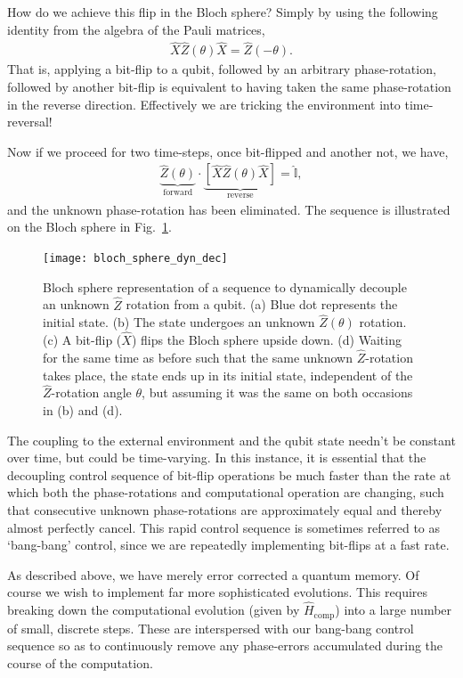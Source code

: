 How do we achieve this flip in the Bloch sphere? Simply by using the following identity from the algebra of the Pauli matrices,
\begin{align}
\hat{X}\hat{Z}(\theta)\hat{X} = 	\hat{Z}(-\theta).
\end{align}
That is, applying a bit-flip to a qubit, followed by an arbitrary phase-rotation, followed by another bit-flip is equivalent to having taken the same phase-rotation in the reverse direction. Effectively we are tricking the environment into time-reversal!

Now if we proceed for two time-steps, once bit-flipped and another not, we have,
\begin{align}
\underbrace{\hat{Z}(\theta)}_{\mathrm{forward}}\cdot\underbrace{[\hat{X}\hat{Z}(\theta)\hat{X}]}_{\mathrm{reverse}} = \hat{\mathbb{I}},
\end{align}
and the unknown phase-rotation has been eliminated. The sequence is illustrated on the Bloch sphere in Fig.~\ref{fig:bloch_sphere_dyn_dec}.

\begin{figure}[htpb]
\texttt{[image: bloch\_sphere\_dyn\_dec]}
\caption{Bloch sphere representation of a sequence to dynamically decouple an unknown $\hat{Z}$ rotation from a qubit. (a) Blue dot represents the initial state. (b) The state undergoes an unknown $\hat{Z}(\theta)$ rotation. (c) A bit-flip ($\hat{X}$) flips the Bloch sphere upside down. (d) Waiting for the same time as before such that the same unknown $\hat{Z}$-rotation takes place, the state ends up in its initial state, independent of the $\hat{Z}$-rotation angle $\theta$, but assuming it was the same on both occasions in (b) and (d).} \label{fig:bloch_sphere_dyn_dec}	
\end{figure}

The coupling to the external environment and the qubit state needn't be constant over time, but could be time-varying. In this instance, it is essential that the decoupling control sequence of bit-flip operations be much faster than the rate at which both the phase-rotations and computational operation are changing, such that consecutive unknown phase-rotations are approximately equal and thereby almost perfectly cancel. This rapid control sequence is sometimes referred to as `bang-bang' control, since we are repeatedly implementing bit-flips at a fast rate. 

As described above, we have merely error corrected a quantum memory. Of course we wish to implement far more sophisticated evolutions. This requires breaking down the computational evolution (given by $\hat{H}_\mathrm{comp}$) into a large number of small, discrete steps. These are interspersed with our bang-bang control sequence so as to continuously remove any phase-errors accumulated during the course of the computation.

